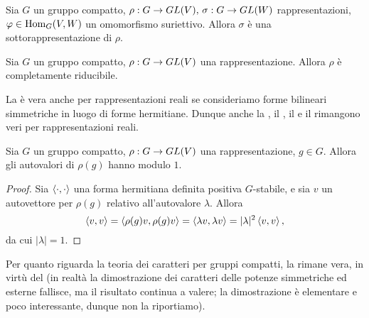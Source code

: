 \begin{corollary}
Sia $G$ un gruppo compatto, $\rho:G\to GL(V),\,\allowbreak\sigma:G\to GL(W)$ rappresentazioni, $\varphi\in\operatorname{Hom}_G(V,W)$ un omomorfismo suriettivo. Allora $\sigma$ è una sottorappresentazione di $\rho$.
\end{corollary}

\begin{corollary}
Sia $G$ un gruppo compatto, $\rho:G\to GL(V)$ una rappresentazione. Allora $\rho$ è completamente riducibile.
\end{corollary}

\begin{remark}
La  è vera anche per rappresentazioni reali se consideriamo forme bilineari simmetriche in luogo di forme hermitiane. Dunque anche la , il , il  e il  rimangono veri per rappresentazioni reali.
\end{remark}


\begin{corollary}
Sia $G$ un gruppo compatto, $\rho:G\to GL(V)$ una rappresentazione, $g\in G$. Allora gli autovalori di $\rho(g)$ hanno modulo $1$.
\end{corollary}
\begin{proof}
Sia $\left\langle\cdot,\cdot\right\rangle$ una forma hermitiana definita positiva $G$-stabile, e sia $v$ un autovettore per $\rho(g)$ relativo all'autovalore $\lambda$. Allora
$$
\left\langle v,v\right\rangle=\left\langle\rho(g)v,\rho(g)v\right\rangle=\left\langle\lambda v,\lambda v\right\rangle=|\lambda|^2\left\langle v,v\right\rangle,
$$
da cui $|\lambda|=1$.
\end{proof}

Per quanto riguarda la teoria dei caratteri per gruppi compatti, la  rimane vera, in virtù del  (in realtà la dimostrazione dei caratteri delle potenze simmetriche ed esterne fallisce, ma il risultato continua a valere; la dimostrazione è elementare e poco interessante, dunque non la riportiamo).

